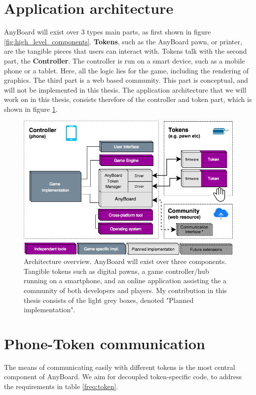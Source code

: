\section{Application architecture}
AnyBoard will exist over 3 types main parts, as first shown in figure \ref{fig:high_level_components}. \textbf{Tokens}, such as the AnyBoard pawn, or printer, are the tangible pieces that users can interact with. Tokens talk with the second part, the \textbf{Controller}. The controller is run on a smart device, such as a mobile phone or a tablet. Here, all the logic lies for the game, including the rendering of graphics. The third part is a web based community. This part is conceptual, and will not be implemented in this thesis. The application architecture that we will work on in this thesis, consists therefore of the controller and token part, which is shown in figure \ref{fig:overview_architecture}. 
\begin{figure}[ht]
\includegraphics[width=12cm]{img/overview_architecture}
\centering
\caption{Architecture overview. AnyBoard will exist over three components. Tangible tokens such as digital pawns, a game controller/hub running on a smartphone, and an online application assisting the a community of both developers and players. My contribution in this thesis consists of the light grey boxes, denoted "Planned implementation".}
\label{fig:overview_architecture}
\end{figure}

\section{Phone-Token communication}
The means of communicating easily with different tokens is the most central component of AnyBoard. We aim for decoupled token-specific code, to address the requirements in table \ref{freq:token}.

